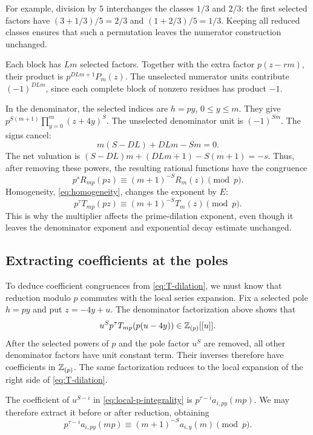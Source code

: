 For example, division by $5$ interchanges the classes $1/3$ and
$2/3$: the first selected factors have
$(3+1/3)/5=2/3$ and $(1+2/3)/5=1/3$. Keeping all reduced classes
ensures that such a permutation leaves the numerator construction
unchanged.

Each block has $Lm$ selected factors. Together with the extra factor
$p(z-rm)$, their product is $p^{DLm+1}P_m(z)$. The unselected
numerator units contribute $(-1)^{DLm}$, since each complete block
of nonzero residues has product $-1$.

In the denominator, the selected indices are $h=py$, $0\le y\le m$.
They give $p^{S(m+1)}\prod_{y=0}^m(z+4y)^S$. The unselected
denominator unit is $(-1)^{Sm}$. The signs cancel:
\[
 m(S-DL)+DLm-Sm=0.
\]
The net valuation is
$(S-DL)m+(DLm+1)-S(m+1)=-s$. Thus, after removing these powers,
the resulting rational functions have the congruence
\begin{equation}\label{eq:R-dilation}
 p^s R_{mp}(pz)\equiv(m+1)^{-S}R_m(z)\pmod p.
\end{equation}
Homogeneity, \eqref{eq:homogeneity}, changes the exponent by $E$:
\begin{equation}\label{eq:T-dilation}
 p^\tau T_{mp}(pz)\equiv(m+1)^{-S}T_m(z)\pmod p.
\end{equation}
This is why the multiplier affects the prime-dilation exponent,
even though it leaves the denominator exponent and exponential
decay estimate unchanged.

\subsection{Extracting coefficients at the poles}

To deduce coefficient congruences from \eqref{eq:T-dilation}, we
must know that reduction modulo $p$ commutes with the local series
expansion. Fix a selected pole $h=py$ and put $z=-4y+u$.
The denominator factorization above shows that
\begin{equation}\label{eq:local-p-integrality}
 u^S p^\tau T_{mp}(p(u-4y))\in\mathbb Z_{(p)}[[u]].
\end{equation}
After the selected powers of $p$ and the pole factor $u^S$ are
removed, all other denominator factors have unit constant term.
Their inverses therefore have coefficients in $\mathbb Z_{(p)}$. The same
factorization reduces to the local expansion of the right side
of \eqref{eq:T-dilation}.

The coefficient of $u^{S-i}$ in \eqref{eq:local-p-integrality}
is $p^{\tau-i}a_{i,py}(mp)$. We may therefore extract it before
or after reduction, obtaining
\begin{equation}\label{eq:selected-coefficients}
 p^{\tau-i}a_{i,py}(mp)
       \equiv(m+1)^{-S}a_{i,y}(m)\pmod p.
\end{equation}

